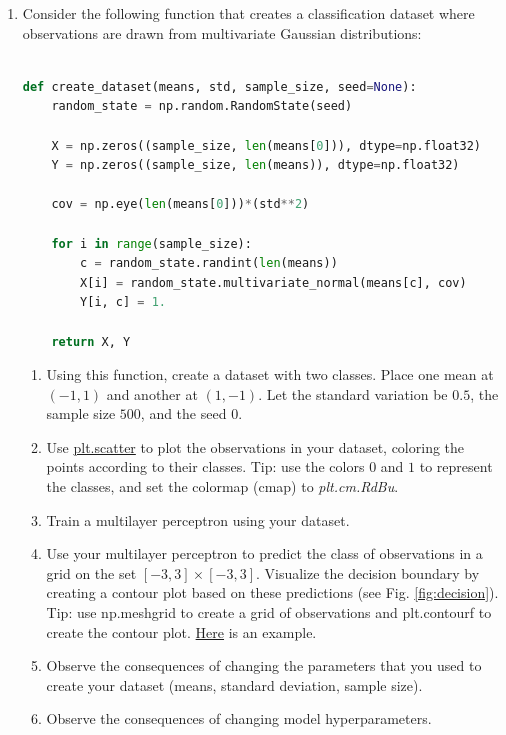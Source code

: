 \documentclass[a4paper,11pt]{article}
\begin{document}
\begin{enumerate}

 \item Consider the following function that creates a classification dataset where observations are drawn from multivariate Gaussian distributions:
 
  \begin{lstlisting}[language=Python, frame=tb, caption=Multivariate Gaussians dataset.]

def create_dataset(means, std, sample_size, seed=None):
    random_state = np.random.RandomState(seed)

    X = np.zeros((sample_size, len(means[0])), dtype=np.float32)
    Y = np.zeros((sample_size, len(means)), dtype=np.float32)

    cov = np.eye(len(means[0]))*(std**2)

    for i in range(sample_size):
        c = random_state.randint(len(means))
        X[i] = random_state.multivariate_normal(means[c], cov)
        Y[i, c] = 1.

    return X, Y
  \end{lstlisting}
  
  \begin{enumerate}
    \item Using this function, create a dataset with two classes. Place one mean at $(-1, 1)$ and another at $(1, -1)$. Let the standard variation be $0.5$, the sample size $500$, and the seed $0$.
    \item Use \href{https://matplotlib.org/3.1.1/gallery/shapes_and_collections/scatter.html}{plt.scatter} to plot the observations in your dataset, coloring the points according to their classes. Tip: use the colors $0$ and $1$ to represent the classes, and set the colormap (cmap) to \emph{plt.cm.RdBu}.
    \item Train a multilayer perceptron using your dataset.
    \item Use your multilayer perceptron to predict the class of observations in a grid on the set $[-3, 3] \times [-3, 3]$. Visualize the decision boundary by creating a contour plot based on these predictions (see Fig. \ref{fig:decision}). Tip: use np.meshgrid to create a grid of observations and plt.contourf to create the contour plot. \href{http://scikit-learn.org/stable/auto_examples/classification/plot_classifier_comparison.html}{Here} is an example.
    \item Observe the consequences of changing the parameters that you used to create your dataset (means, standard deviation, sample size).
    \item Observe the consequences of changing model hyperparameters.


\end{enumerate}
\end{enumerate}
\end{document}
